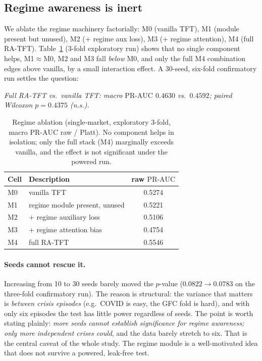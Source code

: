 \documentclass[11pt,a4paper]{article}
\newcommand{\prauc}{\mbox{PR-AUC}}
\begin{document}
\subsection{Regime awareness is inert}
\label{sec:res-regime}
We ablate the regime machinery factorially: M0 (vanilla TFT), M1 (module
present but unused), M2 ($+$ regime aux loss), M3 ($+$ regime attention), M4
(full RA-TFT). Table~\ref{tab:regime} (3-fold exploratory run) shows that no
single component helps, M1$\approx$M0, M2 and M3 fall \emph{below} M0, and
only the full M4 combination edges above vanilla, by a small interaction
effect. A 30-seed, six-fold confirmatory run settles the question:

\begin{center}
\emph{Full RA-TFT vs.\ vanilla TFT: macro $\prauc$ $0.4630$ vs.\ $0.4592$;
paired Wilcoxon $p=0.4375$ (n.s.).}
\end{center}

\begin{table}[h]
\centering\small
\caption{Regime ablation (single-market, exploratory 3-fold, macro $\prauc$
raw / Platt). No component helps in isolation; only the full stack (M4)
marginally exceeds vanilla, and the effect is not significant under the
powered run.}
\label{tab:regime}
\begin{tabular}{llc}
\toprule
Cell & Description & raw $\prauc$ \\
\midrule
M0 & vanilla TFT & 0.5274 \\
M1 & regime module present, unused & 0.5221 \\
M2 & $+$ regime auxiliary loss & 0.5106 \\
M3 & $+$ regime attention bias & 0.4754 \\
M4 & full RA-TFT & 0.5546 \\
\bottomrule
\end{tabular}
\end{table}

\paragraph{Seeds cannot rescue it.} Increasing from 10 to 30 seeds barely
moved the $p$-value ($0.0822\to0.0783$ on the three-fold confirmatory run). The
reason is structural: the variance that matters is \emph{between crisis
episodes} (e.g.\ COVID is easy, the GFC fold is hard), and with only six
episodes the test has little power regardless of seeds. The point is worth
stating plainly: \emph{more seeds cannot establish significance for regime
awareness; only more independent crises could}, and the data barely stretch to
six. That is the central caveat of the whole study. The regime module is a
well-motivated idea that does not survive a powered, leak-free test.
\end{document}
